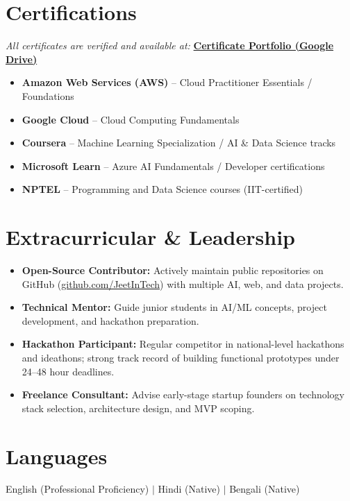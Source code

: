 \documentclass[11pt]{article}
\begin{document}
\section*{Certifications}
\textit{All certificates are verified and available at:} \href{https://drive.google.com/drive/folders/1ZQd-DeX-rXlEVDTwDJfjLjnG7iPc_fEw}{\textbf{Certificate Portfolio (Google Drive)}}

\begin{itemize}
\item \textbf{Amazon Web Services (AWS)} -- Cloud Practitioner Essentials / Foundations
\item \textbf{Google Cloud} -- Cloud Computing Fundamentals
\item \textbf{Coursera} -- Machine Learning Specialization / AI \& Data Science tracks
\item \textbf{Microsoft Learn} -- Azure AI Fundamentals / Developer certifications
\item \textbf{NPTEL} -- Programming and Data Science courses (IIT-certified)
\end{itemize}

\section*{Extracurricular \& Leadership}
\begin{itemize}
\item \textbf{Open-Source Contributor:} Actively maintain public repositories on GitHub (\href{https://github.com/JeetInTech}{github.com/JeetInTech}) with multiple AI, web, and data projects.
\item \textbf{Technical Mentor:} Guide junior students in AI/ML concepts, project development, and hackathon preparation.
\item \textbf{Hackathon Participant:} Regular competitor in national-level hackathons and ideathons; strong track record of building functional prototypes under 24--48 hour deadlines.
\item \textbf{Freelance Consultant:} Advise early-stage startup founders on technology stack selection, architecture design, and MVP scoping.
\end{itemize}

\section*{Languages}
English (Professional Proficiency) \quad $|$ \quad Hindi (Native) \quad $|$ \quad Bengali (Native)
\end{document}
